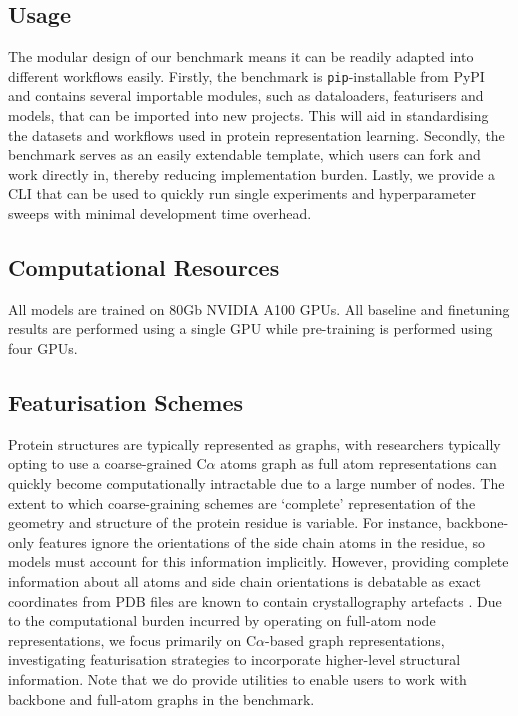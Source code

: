 \subsection{Usage}
The modular design of our benchmark means it can be readily adapted into different workflows easily. Firstly, the benchmark is \texttt{pip}-installable from PyPI and contains several importable modules, such as dataloaders, featurisers and models, that can be imported into new projects. This will aid in standardising the datasets and workflows used in protein representation learning. Secondly, the benchmark serves as an easily extendable template, which users can fork and work directly in, thereby reducing implementation burden. Lastly, we provide a CLI that can be used to quickly run single experiments and hyperparameter sweeps with minimal development time overhead.

\subsection{Computational Resources}
All models are trained on 80Gb NVIDIA A100 GPUs. All baseline and finetuning results are performed using a single GPU while pre-training is performed using four GPUs.


\subsection{Featurisation Schemes}
\label{app:featurisation}

Protein structures are typically represented as graphs, with researchers typically opting to use a coarse-grained C$\alpha$ atoms graph as full atom representations can quickly become computationally intractable due to a large number of nodes. 
The extent to which coarse-graining schemes are `complete' representation of the geometry and structure of the protein residue is variable. For instance, backbone-only features ignore the orientations of the side chain atoms in the residue, so models must account for this information implicitly.
However, providing complete information about all atoms and side chain orientations is debatable as exact coordinates from PDB files are known to contain crystallography artefacts \citep{Dauparas2022}. 
Due to the computational burden incurred by operating on full-atom node representations, we focus primarily on C$\alpha$-based graph representations, investigating featurisation strategies to incorporate higher-level structural information. Note that we do provide utilities to enable users to work with backbone and full-atom graphs in the benchmark.


